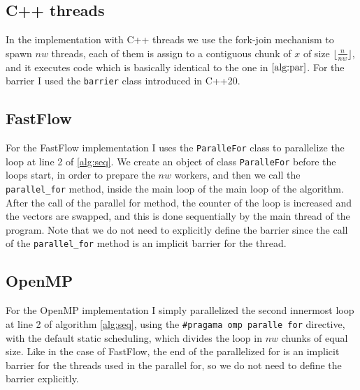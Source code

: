 \documentclass[12pt]{article}
\begin{document}
	\subsection{C++ threads}
	In the implementation with C++ threads we use the fork-join mechanism to spawn $nw$ threads, each of them is assign to a contiguous chunk of $x$ of size $\lfloor\frac{n}{nw}\rfloor$, and it executes code which is basically identical to the one in $\ref{alg:par}$. For the barrier I used the \verb*|barrier| class introduced in C++20.
	\subsection{FastFlow}
	For the FastFlow implementation I uses the \verb|ParalleFor| class to parallelize the loop at line 2 of \ref{alg:seq}. We create an object of class \verb|ParalleFor| before the loops start, in order to prepare the $nw$ workers, and then we call the \verb*|parallel_for| method, inside the main loop of the main loop of the algorithm. After the call of the parallel for method, the counter of the loop is increased and the vectors are swapped, and this is done sequentially by the main thread of the program. Note that we do not need to explicitly define the barrier since the call of the \verb*|parallel_for| method is an implicit barrier for the thread. 
	\subsection{OpenMP}
	For the OpenMP implementation I simply parallelized the second innermost loop at line 2 of algorithm \ref{alg:seq}, using the \verb|#pragama omp paralle for| directive, with the default static scheduling, which divides the loop in $nw$ chunks of equal size. Like in the case of FastFlow, the end of the parallelized for is an implicit barrier for the threads used in the parallel for, so we do not need to define the barrier explicitly.  
\end{document}

